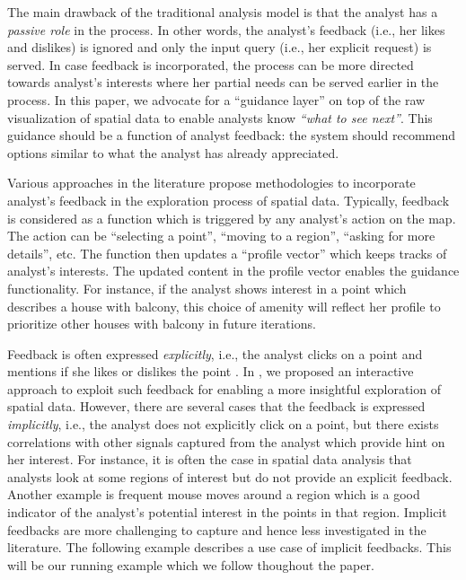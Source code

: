 \vspace{3pt}
The main drawback of the traditional analysis model is that the analyst has a {\em passive role} in the process. In other words, the analyst's feedback (i.e., her likes and dislikes) is ignored and only the input query (i.e., her explicit request) is served. In case feedback is incorporated, the process can be more directed towards analyst's interests where her partial needs can be served earlier in the process. In this paper, we advocate for a ``guidance layer'' on top of the raw visualization of spatial data to enable analysts know {\em ``what to see next''}. This guidance should be a function of analyst feedback: the system should recommend options similar to what the analyst has already appreciated. 

\vspace{2pt}
Various approaches in the literature propose methodologies to incorporate analyst's feedback in the exploration process of spatial data. Typically, feedback is considered as a function which is triggered by any analyst's action on the map. The action can be ``selecting a point'', ``moving to a region'', ``asking for more details'', etc. The function then updates a ``profile vector'' which keeps tracks of analyst's interests. The updated content in the profile vector enables the guidance functionality. For instance, if the analyst shows interest in a point which describes a house with balcony, this choice of amenity will reflect her profile to prioritize other houses with balcony in future iterations.

\vspace{2pt}
Feedback is often expressed {\em explicitly}, i.e., the analyst clicks on a point and mentions if she likes or dislikes the point \cite{kamat2014distributed,Omidvar-Tehrani:2015,omidvar2017geoguide}. In \cite{omidvar2017geoguide}, we proposed an interactive approach to exploit such feedback for enabling a more insightful exploration of spatial data. However, there are several cases that the feedback is expressed {\em implicitly}, i.e., the analyst does not explicitly click on a point, but there exists correlations with other signals captured from the analyst which provide hint on her interest. For instance, it is often the case in spatial data analysis that analysts look at some regions of interest but do not provide an explicit feedback. Another example is frequent mouse moves around a region which is a good indicator of the analyst's potential interest in the points in that region. Implicit feedbacks are more challenging to capture and hence less investigated in the literature. The following example describes a use case of implicit feedbacks. This will be our running example which we follow thoughout the paper.


